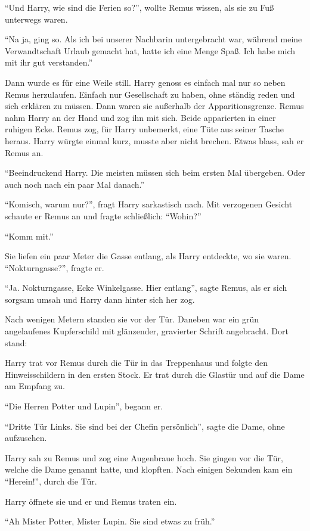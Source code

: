 \enquote{Und Harry, wie sind die Ferien so?}, wollte Remus wissen, als sie zu Fuß unterwegs waren.

\enquote{Na ja, ging so. Als ich bei unserer Nachbarin untergebracht war, während meine Verwandtschaft Urlaub gemacht hat, hatte ich eine Menge Spaß. Ich habe mich mit ihr gut verstanden.}

Dann wurde es für eine Weile still. Harry genoss es einfach mal nur so neben Remus herzulaufen. Einfach nur Gesellschaft zu haben, ohne ständig reden und sich erklären zu müssen. Dann waren sie außerhalb der Apparitionsgrenze. Remus nahm Harry an der Hand und zog ihn mit sich. Beide apparierten in einer ruhigen Ecke. Remus zog, für Harry unbemerkt, eine Tüte aus seiner Tasche heraus. Harry würgte einmal kurz, musste aber nicht brechen. Etwas blass, sah er Remus an.

\enquote{Beeindruckend Harry. Die meisten müssen sich beim ersten Mal übergeben. Oder auch noch nach ein paar Mal danach.}

\enquote{Komisch, warum nur?}, fragt Harry sarkastisch nach. Mit verzogenen Gesicht schaute er Remus an und fragte schließlich: \enquote{Wohin?}

\enquote{Komm mit.}

Sie liefen ein paar Meter die Gasse entlang, als Harry entdeckte, wo sie waren. \enquote{Nokturngasse?}, fragte er.

\enquote{Ja. Nokturngasse, Ecke Winkelgasse. Hier entlang}, sagte Remus, als er sich sorgsam umsah und Harry dann hinter sich her zog.

Nach wenigen Metern standen sie vor der Tür. Daneben war ein grün angelaufenes Kupferschild mit glänzender, gravierter Schrift angebracht. Dort stand: 

Harry trat vor Remus durch die Tür in das Treppenhaus und folgte den Hinweisschildern in den ersten Stock. Er trat durch die Glastür und auf die Dame am Empfang zu.

\enquote{Die Herren Potter und Lupin}, begann er.

\enquote{Dritte Tür Links. Sie sind bei der Chefin persönlich}, sagte die Dame, ohne aufzusehen.

Harry sah zu Remus und zog eine Augenbraue hoch. Sie gingen vor die Tür, welche die Dame genannt hatte, und klopften. Nach einigen Sekunden kam ein \enquote{Herein!}, durch die Tür.

Harry öffnete sie und er und Remus traten ein.

\enquote{Ah Mister Potter, Mister Lupin. Sie sind etwas zu früh.}

